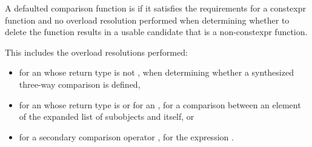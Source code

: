 \pnum
A defaulted comparison function is
%
if it
satisfies the requirements for a constexpr function and
no overload resolution
performed when determining whether to delete the function
results in a usable candidate that is a non-constexpr function.
\begin{note}
This includes the overload resolutions performed:
\begin{itemize}
\item
for an  whose return type is not ,
when determining whether a synthesized three-way comparison is defined,

\item
for an  whose return type is  or
for an ,
for a comparison between an element of the expanded list of
subobjects and itself, or

\item
for a secondary comparison operator ,
for the expression .
\end{itemize}
\end{note}


